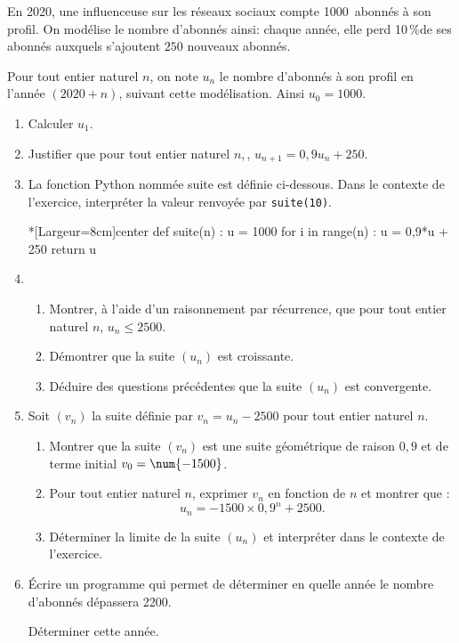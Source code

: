 En 2020, une influenceuse sur les réseaux sociaux compte \num{1000}~abonnés à son profil. On modélise le nombre d'abonnés ainsi: chaque année, elle perd 10\,\%de ses abonnés auxquels s'ajoutent $250$ nouveaux abonnés.

Pour tout entier naturel $n$, on note $u_n$ le nombre d'abonnés à son profil en l'année $(2020 + n)$, suivant cette modélisation. Ainsi $u_0 = \num{1000}$.

\begin{enumerate}
	\item Calculer $u_1$.
	\item Justifier que pour tout entier naturel $n,$, $u_{n+1} = 0,9u_n + 250$.
	\item La fonction \textsf{Python} nommée \og suite \fg{} est définie ci-dessous. Dans le contexte de l'exercice, interpréter la valeur renvoyée par \texttt{suite(10)}.
	
\begin{CodePythonLstAlt}*[Largeur=8cm]{center}
def suite(n) :
	u = 1000
	for i in range(n) :
		u = 0,9*u + 250
	return u
\end{CodePythonLstAlt}
	\item 
	\begin{enumerate}
		\item \hfuzz\maxdimen Montrer, à l'aide d'un raisonnement par récurrence, que pour tout entier naturel $n$, ${u_n \leqslant \num{2500}}$.
		\item Démontrer que la suite $\left(u_n\right)$ est croissante.
		\item Déduire des questions précédentes que la suite $\left(u_n\right)$ est convergente.
	\end{enumerate}
	\item Soit $\left(v_n\right)$ la suite définie par $v_n = u_n - \num{2500}$ pour tout entier naturel $n$.
	\begin{enumerate}
		\item Montrer que la suite $\left(v_n\right)$ est une suite géométrique de raison $0,9$ et de terme initial ${v_0 = \num{- 1500}}$.
		\item Pour tout entier naturel $n$, exprimer $v_n$ en fonction de $n$ et montrer que : \[u_n = - \num{1500} \times  0,9^n + \num{2500}.\]
		\item Déterminer la limite de la suite $\left(u_n\right)$ et interpréter dans le contexte de l'exercice.
	\end{enumerate}
	\item Écrire un programme qui permet de déterminer en quelle année le nombre d'abonnés dépassera \num{2200}.
	
	Déterminer cette année.
\end{enumerate}

